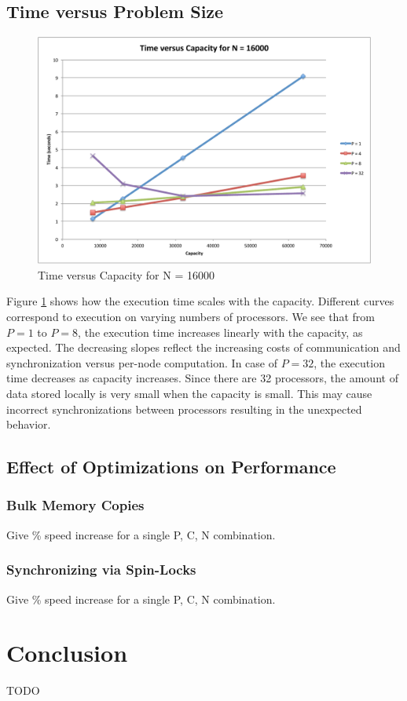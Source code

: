 \documentclass[11pt]{article} %
\begin{document}
\subsection{Time versus Problem Size}

\begin{figure}
\begin{centering}
\includegraphics[width=0.5\paperwidth]{figures/TvsC.pdf}
\caption{Time versus Capacity for N = 16000}
\label{TvsC}
\end{centering}
\end{figure}

Figure \ref{TvsC} shows how the execution time scales with the capacity. Different curves correspond to execution on varying numbers of processors. We see that from $P = 1$ to $P = 8$, the execution time increases linearly with the capacity, as expected. The decreasing slopes reflect the increasing costs of communication and synchronization versus per-node computation. In case of $P = 32$, the execution time decreases as capacity increases. Since there are 32 processors, the amount of data stored locally is very small when the capacity is small. This may cause incorrect synchronizations between processors resulting in the unexpected behavior.

\subsection{Effect of Optimizations on Performance}

\subsubsection{Bulk Memory Copies}

Give \% speed increase for a single P, C, N combination.

\subsubsection{Synchronizing via Spin-Locks}

Give \% speed increase for a single P, C, N combination.

\section{Conclusion}

TODO
\end{document}
